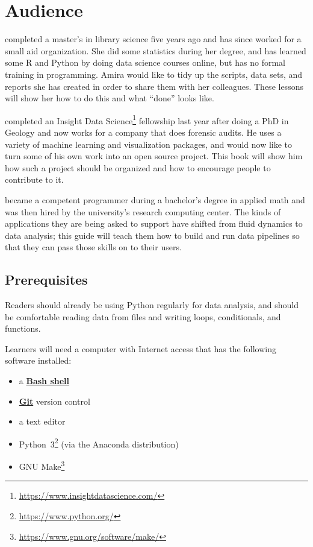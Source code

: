 \documentclass[
]{krantz}
\providecommand{\tightlist}{%
  \setlength{\itemsep}{0pt}\setlength{\parskip}{0pt}}
\renewcommand{\href}[2]{#2\footnote{\url{#1}}}
\newcommand{\gref}[2]{\hyperlink{#2}{\textbf{#1}}}
\begin{document}
\hypertarget{intro-personas}{%
\section{Audience}\label{intro-personas}}

\begin{description}
\tightlist
\item[Amira Khan]
completed a master's in library science five years ago
and has since worked for a small aid organization.
She did some statistics during her degree,
and has learned some R and Python by doing data science courses online,
but has no formal training in programming.
Amira would like to tidy up the scripts, data sets, and reports she has created
in order to share them with her colleagues.
These lessons will show her how to do this and what ``done'' looks like.
\item[Jun Hsu]
completed an \href{https://www.insightdatascience.com/}{Insight Data Science} fellowship last year after doing a PhD in Geology
and now works for a company that does forensic audits.
He uses a variety of machine learning and visualization packages,
and would now like to turn some of his own work into an open source project.
This book will show him how such a project should be organized
and how to encourage people to contribute to it.
\item[Sami Virtanen]
became a competent programmer during a bachelor's degree in applied math
and was then hired by the university's research computing center.
The kinds of applications they are being asked to support
have shifted from fluid dynamics to data analysis;
this guide will teach them how to build and run data pipelines
so that they can pass those skills on to their users.
\end{description}

\hypertarget{prerequisites}{%
\subsection{Prerequisites}\label{prerequisites}}

Readers should already be using Python regularly for data analysis,
and should be comfortable reading data from files
and writing loops, conditionals, and functions.

Learners will need a computer with Internet access
that has the following software installed:

\begin{itemize}
\tightlist
\item
  a \gref{Bash shell}{shell}
\item
  \gref{Git}{git} version control
\item
  a text editor
\item
  \href{https://www.python.org/}{Python~3} (via the Anaconda distribution)
\item
  \href{https://www.gnu.org/software/make/}{GNU Make}
\end{itemize}
\end{document}
